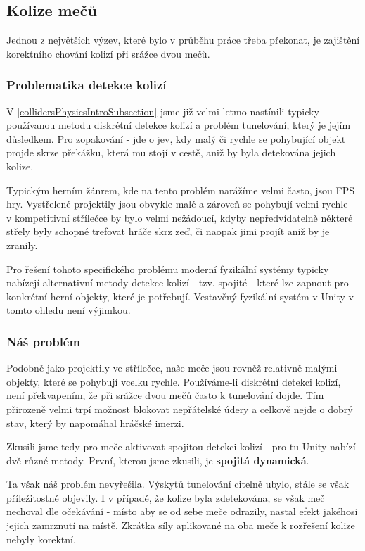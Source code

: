 \subsection{Kolize mečů} \label{swordCollisionsSection}

Jednou z největších výzev, které bylo v průběhu práce třeba překonat, je zajištění korektního chování kolizí při srážce dvou mečů.


\subsubsection*{Problematika detekce kolizí}

V \ref{collidersPhysicsIntroSubsection} jsme již velmi letmo nastínili typicky používanou metodu diskrétní detekce kolizí a problém tunelování, který je jejím důsledkem. Pro zopakování - jde o jev, kdy malý či rychle se pohybující objekt projde skrze překážku, která mu stojí v cestě, aniž by byla detekována jejich kolize.

Typickým herním žánrem, kde na tento problém narážíme velmi často, jsou \acs{FPS} hry. Vystřelené projektily jsou obvykle malé a zároveň se pohybují velmi rychle - v kompetitivní střílečce by bylo velmi nežádoucí, kdyby nepředvídatelně některé střely byly schopné trefovat hráče skrz zeď, či naopak jimi projít aniž by je zranily.  

Pro řešení tohoto specifického problému moderní fyzikální systémy typicky nabízejí alternativní metody detekce kolizí - tzv. spojité - které lze zapnout pro konkrétní herní objekty, které je potřebují. Vestavěný fyzikální systém v Unity v tomto ohledu není výjimkou.


\subsubsection*{Náš problém}

Podobně jako projektily ve střílečce, naše meče jsou rovněž relativně malými objekty, které se pohybují vcelku rychle. Používáme-li diskrétní detekci kolizí, není překvapením, že při srážce dvou mečů často k tunelování dojde. Tím přirozeně velmi trpí možnost blokovat nepřátelské údery a celkově nejde o dobrý stav, který by napomáhal hráčské imerzi.

\bigbreak

Zkusili jsme tedy pro meče aktivovat spojitou detekci kolizí - pro tu Unity nabízí dvě různé metody. První, kterou jsme zkusili, je \textbf{spojitá dynamická}.

Ta však náš problém nevyřešila. Výskytů tunelování citelně ubylo, stále se však příležitostně objevily. I v případě, že kolize byla zdetekována, se však meč nechoval dle očekávání - místo aby se od sebe meče odrazily, nastal efekt jakéhosi jejich zamrznutí na místě. Zkrátka síly aplikované na oba meče k rozřešení kolize nebyly korektní.

